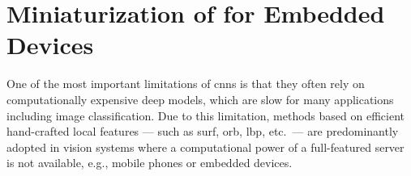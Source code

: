 
\graphicspath{{img/parking/}}

\chapter{Miniaturization of  for Embedded Devices}
\label{ch:miniaturization}

One of the most important limitations of \glspl{cnn} is that they often rely on computationally expensive deep models, which are slow for many applications including image classification.
Due to this limitation, methods based on efficient hand-crafted local features --- such as \acrshort{surf}, \acrshort{orb}, \acrshort{lbp}, etc.\ --- are predominantly adopted in vision systems where a computational power of a full-featured server is not available, e.g., mobile phones or embedded devices.

